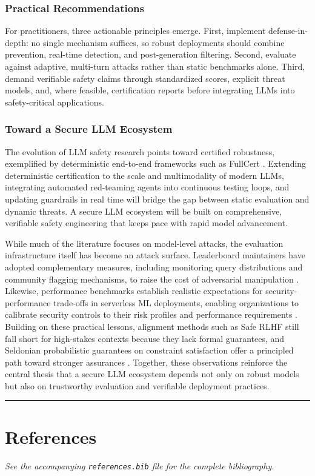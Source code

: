 \documentclass[11pt,a4paper]{article}
\begin{document}
\subsubsection{Practical Recommendations}

For practitioners, three actionable principles emerge. First, implement defense-in-depth: no single mechanism suffices, so robust deployments should combine prevention, real-time detection, and post-generation filtering. Second, evaluate against adaptive, multi-turn attacks rather than static benchmarks alone. Third, demand verifiable safety claims through standardized scores, explicit threat models, and, where feasible, certification reports before integrating LLMs into safety-critical applications.

\subsubsection{Toward a Secure LLM Ecosystem}

The evolution of LLM safety research points toward certified robustness, exemplified by deterministic end-to-end frameworks such as FullCert \cite{Lorenz_2024_Fullcert_7dbc4820}. Extending deterministic certification to the scale and multimodality of modern LLMs, integrating automated red-teaming agents into continuous testing loops, and updating guardrails in real time will bridge the gap between static evaluation and dynamic threats. A secure LLM ecosystem will be built on comprehensive, verifiable safety engineering that keeps pace with rapid model advancement.

While much of the literature focuses on model-level attacks, the evaluation infrastructure itself has become an attack surface. Leaderboard maintainers have adopted complementary measures, including monitoring query distributions and community flagging mechanisms, to raise the cost of adversarial manipulation \cite{Suri_2025_Exploiting_a50a2301}. Likewise, performance benchmarks establish realistic expectations for security-performance trade-offs in serverless ML deployments, enabling organizations to calibrate security controls to their risk profiles and performance requirements \cite{Pathade_2026_AI_d9f29391}. Building on these practical lessons, alignment methods such as Safe RLHF still fall short for high-stakes contexts because they lack formal guarantees, and Seldonian probabilistic guarantees on constraint satisfaction offer a principled path toward stronger assurances \cite{Chittepu_2025_Reinforcement_540113b3}. Together, these observations reinforce the central thesis that a secure LLM ecosystem depends not only on robust models but also on trustworthy evaluation and verifiable deployment practices.

\noindent\rule{\textwidth}{0.4pt}
\section{References}

\textit{See the accompanying \texttt{references.bib} file for the complete bibliography.}




\end{document}
